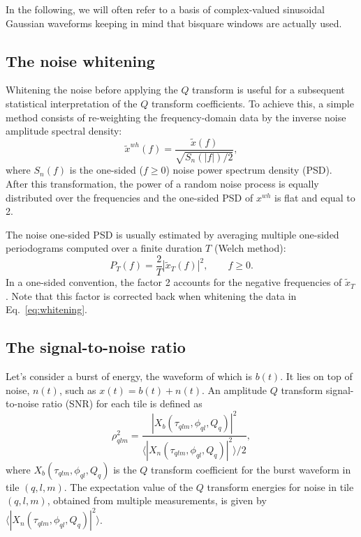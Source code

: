 \documentclass[aps]{revtex4-1}
\begin{document}
In the following, we will often refer to a basis of complex-valued sinusoidal Gaussian waveforms keeping in mind that bisquare windows are actually used.

\subsection{The noise whitening} \label{sec:whitening}
Whitening the noise before applying the $Q$ transform is useful for a subsequent statistical interpretation of the $Q$ transform coefficients. To achieve this, a simple method consists of re-weighting the frequency-domain data by the inverse noise amplitude spectral density:
\begin{equation}
  \tilde{x}^{wh}(f) = \frac{\tilde{x}(f)}{\sqrt{S_n(|f|)/2}},
  \label{eq:whitening}
\end{equation}
where $S_n(f)$ is the one-sided ($f \ge 0$) noise power spectrum density (PSD). After this transformation, the power of a random noise process is equally distributed over the frequencies and the one-sided PSD of $x^{wh}$ is flat and equal to 2.

The noise one-sided PSD is usually estimated by averaging multiple one-sided periodograms computed over a finite duration $T$ (Welch method):
\begin{equation}
  P_T(f) = \frac{2}{T}\left|\tilde{x}_T(f)\right|^2, \qquad f \ge 0.
  \label{eq:periodogram}
\end{equation}
In a one-sided convention, the factor 2 accounts for the negative frequencies of $\tilde{x}_T$. Note that this factor is corrected back when whitening the data in Eq.~\ref{eq:whitening}.

\subsection{The signal-to-noise ratio} \label{sec:snr}
Let's consider a burst of energy, the waveform of which is $b(t)$. It lies on top of noise, $n(t)$, such as $x(t) = b(t) + n(t)$. An amplitude $Q$ transform signal-to-noise ratio (SNR) for each tile is defined as
\begin{equation}
  \rho_{qlm}^2 =  \frac{|X_b(\tau_{qlm}, \phi_{ql}, Q_q)|^2}{\langle |X_n(\tau_{qlm}, \phi_{ql}, Q_q)|^2 \rangle/2}, \label{eq:snrdef}
\end{equation}
where $X_b(\tau_{qlm}, \phi_{ql}, Q_q)$ is the $Q$ transform coefficient for the burst waveform in tile $(q,l,m)$. The expectation value of the $Q$ transform energies for noise in tile $(q,l,m)$, obtained from multiple measurements, is given by $\langle |X_n(\tau_{qlm}, \phi_{ql}, Q_q)|^2\rangle$.
\end{document}
